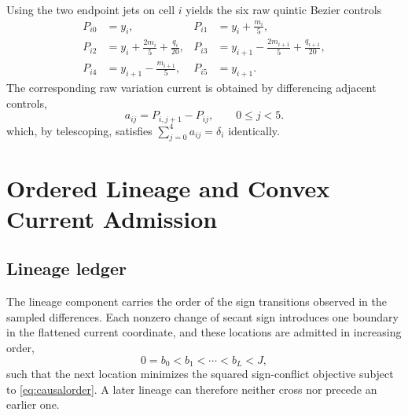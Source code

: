 \documentclass[journal]{IEEEtran}
\begin{document}
Using the two endpoint jets on cell \(i\) yields the six raw quintic Bezier
controls
\begin{align}
 P_{i0}&=y_i,&
 P_{i1}&=y_i+\frac{m_i}{5}, \nonumber\\
 P_{i2}&=y_i+\frac{2m_i}{5}+\frac{q_i}{20},&
 P_{i3}&=y_{i+1}-\frac{2m_{i+1}}{5}+\frac{q_{i+1}}{20}, \label{eq:controls}\\
 P_{i4}&=y_{i+1}-\frac{m_{i+1}}{5},&
 P_{i5}&=y_{i+1}. \nonumber
\end{align}
The corresponding raw variation current is obtained by differencing adjacent
controls,
\begin{equation}
  a_{ij}=P_{i,j+1}-P_{ij},\qquad 0\leq j<5.
  \label{eq:rawcurrent}
\end{equation}
which, by telescoping, satisfies
\(\sum_{j=0}^{4}a_{ij}=\delta_i\) identically.

\section{Ordered Lineage and Convex Current Admission}

\subsection{Lineage ledger}

The lineage component carries the order of the sign transitions observed in
the sampled differences. Each nonzero change of secant sign introduces one
boundary in the flattened current coordinate, and these locations are
admitted in increasing order,
\begin{equation}
 0=b_0<b_1<\cdots<b_L<J,
 \label{eq:causalorder}
\end{equation}
such that the next location minimizes the squared sign-conflict objective
subject to \eqref{eq:causalorder}. A later lineage can therefore neither cross
nor precede an earlier one.
\end{document}
